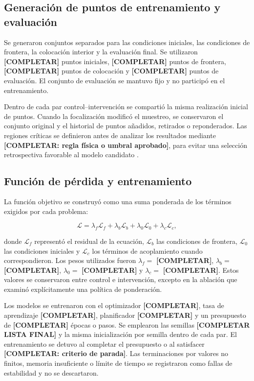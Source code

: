 \subsection{Generación de puntos de entrenamiento y evaluación}

Se generaron conjuntos separados para las condiciones iniciales, las condiciones de frontera, la colocación interior y la evaluación final. Se utilizaron \textbf{[COMPLETAR]} puntos iniciales, \textbf{[COMPLETAR]} puntos de frontera, \textbf{[COMPLETAR]} puntos de colocación y \textbf{[COMPLETAR]} puntos de evaluación. El conjunto de evaluación se mantuvo fijo y no participó en el entrenamiento.

Dentro de cada par control–intervención se compartió la misma realización inicial de puntos. Cuando la focalización modificó el muestreo, se conservaron el conjunto original y el historial de puntos añadidos, retirados o reponderados. Las regiones críticas se definieron antes de analizar los resultados mediante \textbf{[COMPLETAR: regla física o umbral aprobado]}, para evitar una selección retrospectiva favorable al modelo candidato \cite{lu2021deepxde,wu2023sampling}.

\subsection{Función de pérdida y entrenamiento}

La función objetivo se construyó como una suma ponderada de los términos exigidos por cada problema:

$$
\mathcal{L}=\lambda_f\mathcal{L}_f+\lambda_b\mathcal{L}_b+\lambda_0\mathcal{L}_0+\lambda_c\mathcal{L}_c,
$$

donde $\mathcal{L}_f$ representó el residual de la ecuación, $\mathcal{L}_b$ las condiciones de frontera, $\mathcal{L}_0$ las condiciones iniciales y $\mathcal{L}_c$ los términos de acoplamiento cuando correspondieron. Los pesos utilizados fueron $\lambda_f=$ \textbf{[COMPLETAR]}, $\lambda_b=$ \textbf{[COMPLETAR]}, $\lambda_0=$ \textbf{[COMPLETAR]} y $\lambda_c=$ \textbf{[COMPLETAR]}. Estos valores se conservaron entre control e intervención, excepto en la ablación que examinó explícitamente una política de ponderación.

Los modelos se entrenaron con el optimizador \textbf{[COMPLETAR]}, tasa de aprendizaje \textbf{[COMPLETAR]}, planificador \textbf{[COMPLETAR]} y un presupuesto de \textbf{[COMPLETAR]} épocas o pasos. Se emplearon las semillas \textbf{[COMPLETAR LISTA FINAL]} y la misma inicialización por semilla dentro de cada par. El entrenamiento se detuvo al completar el presupuesto o al satisfacer \textbf{[COMPLETAR: criterio de parada]}. Las terminaciones por valores no finitos, memoria insuficiente o límite de tiempo se registraron como fallas de estabilidad y no se descartaron.

